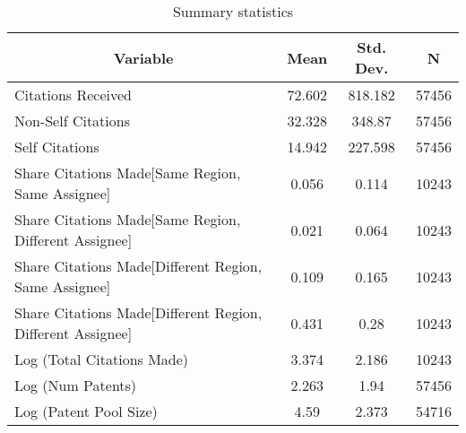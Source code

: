
\begin{table}[htbp]\centering \caption{Summary statistics \label{sumstat}}
\begin{tabular}{l c c  c}\hline\hline
\multicolumn{1}{c}{\textbf{Variable}} & \textbf{Mean}
 & \textbf{Std. Dev.} & \textbf{N}\\ \hline
Citations Received & 72.602 & 818.182  & 57456\\
Non-Self Citations & 32.328 & 348.87  & 57456\\
Self Citations & 14.942 & 227.598  & 57456\\
Share Citations Made[Same Region, Same Assignee] & 0.056 & 0.114  & 10243\\
Share Citations Made[Same Region, Different Assignee] & 0.021 & 0.064  & 10243\\
Share Citations Made[Different Region, Same Assignee] & 0.109 & 0.165  & 10243\\
Share Citations Made[Different Region, Different Assignee] & 0.431 & 0.28  & 10243\\
Log (Total Citations Made) & 3.374 & 2.186  & 10243\\
Log (Num Patents) & 2.263 & 1.94  & 57456\\
Log (Patent Pool Size) & 4.59 & 2.373  & 54716\\
\hline\end{tabular}
\end{table}
